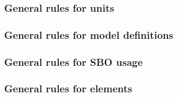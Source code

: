 \begin{sbmlenum}

\end{sbmlenum} \subsubsection*{General rules for units} \begin{sbmlenum}


\end{sbmlenum} \subsubsection*{General rules for model definitions} \begin{sbmlenum}


\end{sbmlenum} \subsubsection*{General rules for SBO usage} \begin{sbmlenum}


\begin{blockChanged}
\end{blockChanged}

\end{sbmlenum} \subsubsection*{General rules for  elements} \begin{sbmlenum}


\end{sbmlenum}

